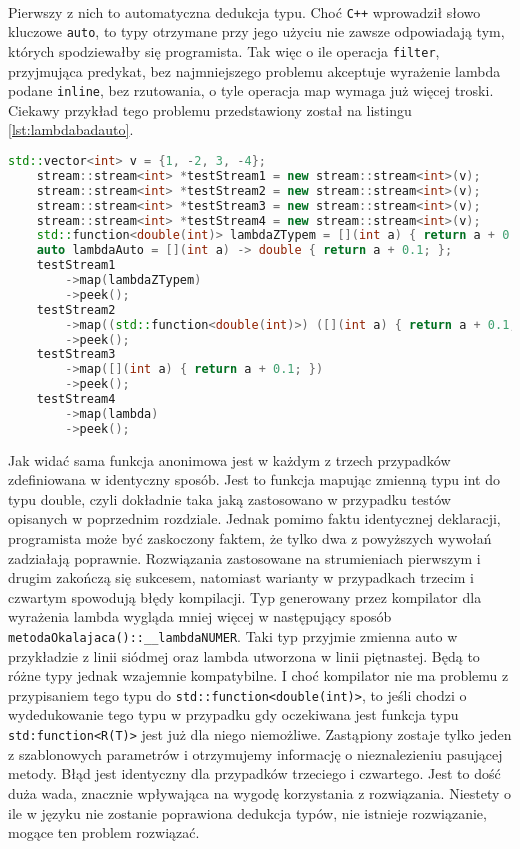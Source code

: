 \documentclass[a4paper,10pt]{report}
\begin{document}
\paragraph{} Pierwszy z nich to automatyczna dedukcja typu. Choć \verb|C++| wprowadził słowo kluczowe \verb|auto|, to typy otrzymane przy jego użyciu nie zawsze odpowiadają tym, których spodziewałby się programista. Tak więc o ile operacja \verb|filter|, przyjmująca predykat, bez najmniejszego problemu akceptuje wyrażenie lambda podane \verb|inline|, bez rzutowania, o tyle operacja map wymaga już więcej troski. Ciekawy przykład tego problemu przedstawiony został na listingu \ref{lst:lambdabadauto}.
\begin{lstlisting}[caption={Błędna dedukcja typu},label={lst:lambdabadauto},language=cpp]
	std::vector<int> v = {1, -2, 3, -4};
    stream::stream<int> *testStream1 = new stream::stream<int>(v);
    stream::stream<int> *testStream2 = new stream::stream<int>(v);
    stream::stream<int> *testStream3 = new stream::stream<int>(v);
    stream::stream<int> *testStream4 = new stream::stream<int>(v);
    std::function<double(int)> lambdaZTypem = [](int a) { return a + 0.1; };
    auto lambdaAuto = [](int a) -> double { return a + 0.1; };
    testStream1
        ->map(lambdaZTypem)
        ->peek();
    testStream2
        ->map((std::function<double(int)>) ([](int a) { return a + 0.1; }))
        ->peek();
    testStream3
        ->map([](int a) { return a + 0.1; })
        ->peek();
    testStream4
        ->map(lambda)
        ->peek();
\end{lstlisting}
Jak widać sama funkcja anonimowa jest w każdym z trzech przypadków zdefiniowana w identyczny sposób. Jest to funkcja mapując zmienną typu int do typu double, czyli dokładnie taka jaką zastosowano w przypadku testów opisanych w poprzednim rozdziale. Jednak pomimo faktu identycznej deklaracji, programista może być zaskoczony faktem, że tylko dwa z powyższych wywołań zadziałają poprawnie. Rozwiązania zastosowane na strumieniach pierwszym i drugim zakończą się sukcesem, natomiast warianty w przypadkach trzecim i czwartym spowodują błędy kompilacji. Typ generowany przez kompilator dla wyrażenia lambda wygląda mniej więcej w następujący sposób \verb|metodaOkalajaca()::__lambdaNUMER|. Taki typ przyjmie zmienna auto w przykładzie z linii siódmej oraz lambda utworzona w linii piętnastej. Będą to różne typy jednak wzajemnie kompatybilne. I choć kompilator nie ma problemu z przypisaniem tego typu do \verb|std::function<double(int)>|, to jeśli chodzi o wydedukowanie tego typu w przypadku gdy oczekiwana jest funkcja typu \verb|std:function<R(T)>| jest już dla niego niemożliwe. Zastąpiony zostaje tylko jeden z szablonowych parametrów i otrzymujemy informację o nieznalezieniu pasującej metody. Błąd jest identyczny dla przypadków trzeciego i czwartego. Jest to dość duża wada, znacznie wpływająca na wygodę korzystania z rozwiązania. Niestety o ile w języku nie zostanie poprawiona dedukcja typów, nie istnieje rozwiązanie, mogące ten problem rozwiązać.
\end{document}
